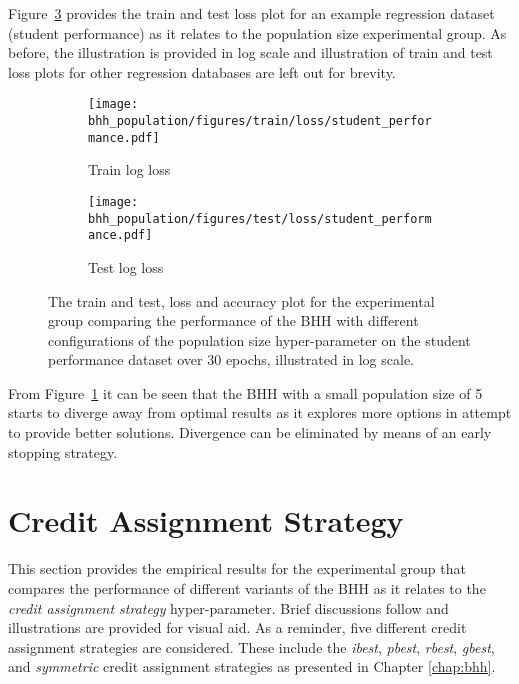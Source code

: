 Figure~\ref{fig:results:population:figures:student_performance} provides the train and test loss plot for an example regression dataset (student performance) as it relates to the population size experimental group. As before, the illustration is provided in log scale and illustration of train and test loss plots for other regression databases are left out for brevity.

\begin{figure}[htbp]
	\begin{subfigure}{0.5\textwidth}
		\centering
		\texttt{[image: bhh\_population/figures/train/loss/student\_performance.pdf]}
		\caption{Train log loss}
		\label{fig:results:population:figures:loss:train:student_performance}
	\end{subfigure}
	\begin{subfigure}{0.5\textwidth}
		\centering
		\texttt{[image: bhh\_population/figures/test/loss/student\_performance.pdf]}
		\caption{Test log loss}
		\label{fig:results:population:figures:loss:test:student_performance}
	\end{subfigure}
	\par\bigskip
	\caption{The train and test, loss and accuracy plot for the experimental group comparing the performance of the \acs{BHH} with different configurations of the population size hyper-parameter on the student performance dataset over 30 epochs, illustrated in log scale.}
	\label{fig:results:population:figures:student_performance}
\end{figure}

From Figure~\ref{fig:results:population:figures:loss:train:student_performance} it can be seen that the \acs{BHH} with a small population size of 5 starts to diverge away from optimal results as it explores more options in attempt to provide better solutions. Divergence can be eliminated by means of an early stopping strategy.

\section{Credit Assignment Strategy}\label{sec:results:credit}

This section provides the empirical results for the experimental group that compares the performance of different variants of the \acs{BHH} as it relates to the \textit{credit assignment strategy} hyper-parameter. Brief discussions follow and illustrations are provided for visual aid. As a reminder, five different credit assignment strategies are considered. These include the \textit{ibest}, \textit{pbest}, \textit{rbest}, \textit{gbest}, and \textit{symmetric} credit assignment strategies as presented in Chapter \ref{chap:bhh}.

